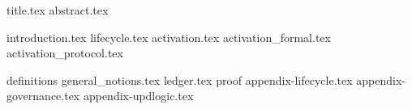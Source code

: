 \documentclass{llncs}
\begin{document}
{title.tex}
{abstract.tex}

{introduction.tex}
{lifecycle.tex}
{activation.tex}
{activation_formal.tex}
{activation_protocol.tex}
\clearpage


\appendix
{definitions}
{general_notions.tex}
{ledger.tex}
{proof}
{appendix-lifecycle.tex}
{appendix-governance.tex}
{appendix-updlogic.tex}
\end{document}
